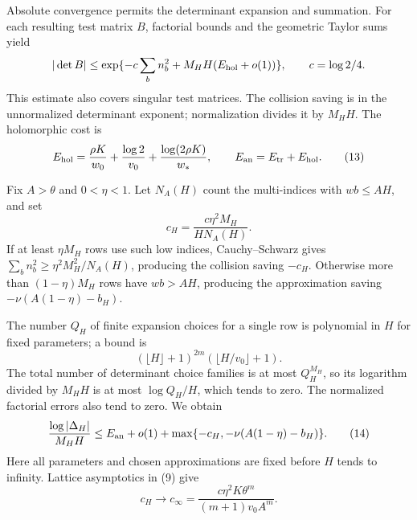Absolute convergence permits the determinant expansion and summation. For each resulting test matrix \(B\), factorial bounds and the geometric Taylor sums yield
\[
|\det B|\le\exp\{-c\sum_bn_b^2+M_HH(E_{\rm hol}+o(1))\},
\qquad c=\log2/4.
\]
This estimate also covers singular test matrices. The collision saving is in the unnormalized determinant exponent; normalization divides it by \(M_HH\). The holomorphic cost is
\[
E_{\rm hol}=
\frac{\rho K}{w_0}+\frac{\log2}{v_0}
+\frac{\log(2\rho K)}{w_*},\qquad
E_{\rm an}=E_{\rm tr}+E_{\rm hol}.
\tag{13}
\]

Fix \(A>\theta\) and \(0<\eta<1\). Let \(N_A(H)\) count the multi-indices with \(wb\le AH\), and set
\[
c_H=\frac{c\eta^2M_H}{H N_A(H)}.
\]
If at least \(\eta M_H\) rows use such low indices, Cauchy--Schwarz gives \(\sum_bn_b^2\ge\eta^2M_H^2/N_A(H)\), producing the collision saving \(-c_H\). Otherwise more than \((1-\eta)M_H\) rows have \(wb>AH\), producing the approximation saving \(-\nu(A(1-\eta)-b_H)\).

The number \(Q_H\) of finite expansion choices for a single row is polynomial in \(H\) for fixed parameters; a bound is
\[
(\lfloor H\rfloor+1)^{2m}(\lfloor H/v_0\rfloor+1).
\]
The total number of determinant choice families is at most \(Q_H^{M_H}\), so its logarithm divided by \(M_HH\) is at most \(\log Q_H/H\), which tends to zero. The normalized factorial errors also tend to zero. We obtain
\[
\frac{\log|\Delta_H|}{M_HH}
\le E_{\rm an}+o(1)+
\max\{-c_H,-\nu(A(1-\eta)-b_H)\}.
\tag{14}
\]
Here all parameters and chosen approximations are fixed before \(H\) tends to infinity. Lattice asymptotics in (9) give
\[
c_H\longrightarrow
c_\infty=\frac{c\eta^2K\theta^m}{(m+1)v_0A^m}.
\tag{15}
\]
